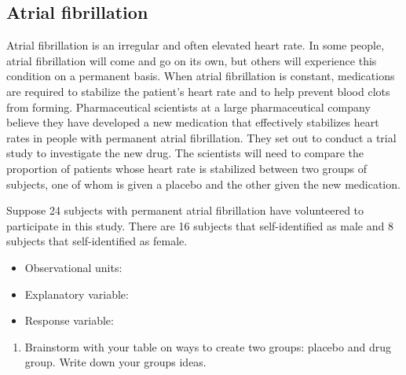 \documentclass[
]{report}
\providecommand{\tightlist}{%
  \setlength{\itemsep}{0pt}\setlength{\parskip}{0pt}}
\begin{document}
\vspace{1.5in}

\subsection{Atrial fibrillation}\label{atrial-fibrillation}

Atrial fibrillation is an irregular and often elevated heart rate. In some people, atrial fibrillation will come and go on its own, but others will experience this condition on a permanent basis. When atrial fibrillation is constant, medications are required to stabilize the patient's heart rate and to help prevent blood clots from forming. Pharmaceutical scientists at a large pharmaceutical company believe they have developed a new medication that effectively stabilizes heart rates in people with permanent atrial fibrillation. They set out to conduct a trial study to investigate the new drug. The scientists will need to compare the proportion of patients whose heart rate is stabilized between two groups of subjects, one of whom is given a placebo and the other given the new medication.

Suppose 24 subjects with permanent atrial fibrillation have volunteered to participate in this study. There are 16 subjects that self-identified as male and 8 subjects that self-identified as female.

\vspace{2mm}

\begin{itemize}
\tightlist
\item
  Observational units:
\end{itemize}

\vspace{2mm}

\begin{itemize}
\tightlist
\item
  Explanatory variable:
\end{itemize}

\vspace{2mm}

\begin{itemize}
\tightlist
\item
  Response variable:
\end{itemize}

\vspace{2mm}

\begin{enumerate}
\def\labelenumi{\arabic{enumi}.}
\tightlist
\item
  Brainstorm with your table on ways to create two groups: placebo and drug group. Write down your groups ideas.
\end{enumerate}
\end{document}
